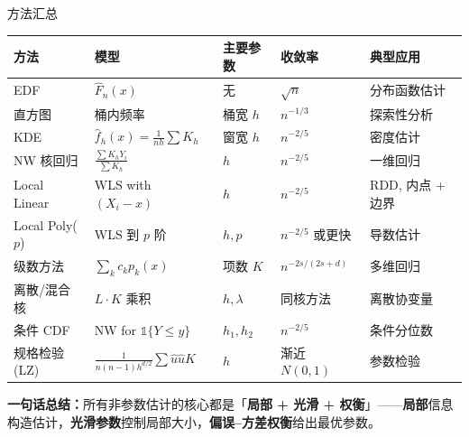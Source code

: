 \documentclass[aspectratio=169, 10pt]{beamer}
\renewcommand{\arraystretch}{1.05}
\begin{document}
\begin{frame}{方法汇总}
  \centering\footnotesize
  \renewcommand{\arraystretch}{1.25}
  \begin{tabular}{@{}p{2.6cm}p{3.4cm}p{2.4cm}p{2.4cm}p{2.2cm}@{}}
    \toprule
    \textbf{方法} & \textbf{模型} & \textbf{主要参数} & \textbf{收敛率} & \textbf{典型应用} \\
    \midrule
    EDF & $\hat F_n(x)$ & 无 & $\sqrt{n}$ & 分布函数估计 \\
    直方图 & 桶内频率 & 桶宽 $h$ & $n^{-1/3}$ & 探索性分析 \\
    KDE & $\hat f_h(x) = \frac{1}{nh}\sum K_h$ & 窗宽 $h$ & $n^{-2/5}$ & 密度估计 \\
    NW 核回归 & $\frac{\sum K_h Y_i}{\sum K_h}$ & $h$ & $n^{-2/5}$ & 一维回归 \\
    Local Linear & WLS with $(X_i-x)$ & $h$ & $n^{-2/5}$ & RDD, 内点 + 边界 \\
    Local Poly($p$) & WLS 到 $p$ 阶 & $h, p$ & $n^{-2/5}$ 或更快 & 导数估计 \\
    级数方法 & $\sum_k c_k p_k(x)$ & 项数 $K$ & $n^{-2s/(2s+d)}$ & 多维回归 \\
    离散/混合核 & $L\cdot K$ 乘积 & $h, \lambda$ & 同核方法 & 离散协变量 \\
    条件 CDF & NW for $\mathds{1}\{Y\leq y\}$ & $h_1, h_2$ & $n^{-2/5}$ & 条件分位数 \\
    规格检验 (LZ) & $\frac{1}{n(n-1)h^{d/2}}\sum\hat u \hat u K$ & $h$ & 渐近 $N(0,1)$ & 参数检验 \\
    \bottomrule
  \end{tabular}

  \begin{keybox}
    \textbf{一句话总结：}所有非参数估计的核心都是「\textbf{局部 + 光滑 + 权衡}」——\textbf{局部}信息构造估计，\textbf{光滑参数}控制局部大小，\textbf{偏误--方差权衡}给出最优参数。
  \end{keybox}
\end{frame}
\end{document}
